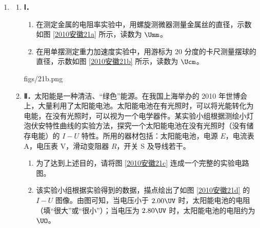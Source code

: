 \documentclass[\gkver]{gaokaozhenti}
\begin{document}
\begin{enumerate}

\item
\begin{enumerate}
	\item
	\textbf{Ⅰ．}
	\begin{enumerate}
		\item
		在测定金属的电阻率实验中，用螺旋测微器测量金属丝的直径，示数如图 \ref{2010安徽21a} 所示，读数为 $\Umm$。

		\item
		在用单摆测定重力加速度实验中，用游标为 20 分度的卡尺测量摆球的直径，示数如图 \ref{2010安徽21b} 所示，读数为 $\Ucm$。
	\end{enumerate}

	{figs/21b.png}

	\item
	\textbf{Ⅱ．}太阳能是一种清洁、“绿色”能源。在我国上海举办的 2010 年世博会上，大量利用了太阳能电池。太阳能电池在有光照时，可以将光能转化为电能，在没有光照时，可以视为一个电学器件。某实验小组根据测绘小灯泡伏安特性曲线的实验方法，探究一个太阳能电池在没有光照时（没有储存电能）的 $I-U$ 特性。所用的器材包括：太阳能电池，电源 $E$，电流表 A，电压表 V，滑动变阻器 $R$，开关 S 及导线若干。
	\begin{enumerate}
		\item
		为了达到上述目的，请将图 \ref{2010安徽21c} 连成一个完整的实验电路图。

		\item
		该实验小组根据实验得到的数据，描点绘出了如图 \ref{2010安徽21d} 的 $I-U$ 图像。由图可知，当电压小于 $2.00\UV$ 时，太阳能电池的电阻（填“很大”或“很小”）；当电压为 $2.80\UV$ 时，太阳能电池的电阻约为 $\UO$。
	\end{enumerate}


\end{enumerate}
\end{enumerate}
\end{document}
